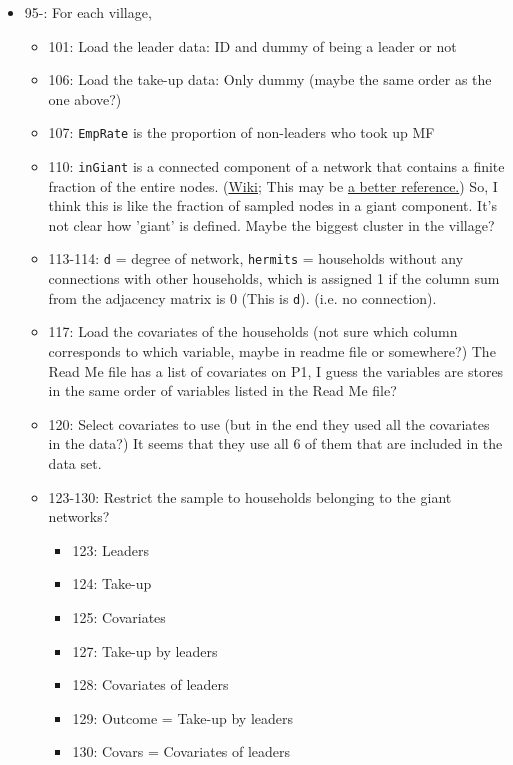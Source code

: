 \documentclass[10pt,letterpaper]{article}
\begin{document}
\begin{itemize}
\begin{itemize}
  \item 95-: For each village,
    \begin{itemize}
      \item 101: Load the leader data: ID and dummy of being a leader or not
      \item 106: Load the take-up data: Only dummy (maybe the same order as the one above?)
      \item 107: \texttt{EmpRate} is the proportion of non-leaders who took up MF
      \item 110: \texttt{inGiant} is a connected component of a network that contains a finite fraction of the entire nodes. (\href{https://en.wikipedia.org/wiki/Giant_component}{Wiki}; This may be \href{https://www.futurelearn.com/courses/social-media/0/steps/16048}{a better reference.}) So, I think this is like the fraction of sampled nodes in a giant component. It's not clear how 'giant' is defined. Maybe the biggest cluster in the village?
      \item 113-114: \texttt{d} = degree of network, \texttt{hermits} = households without any connections with other households, which is assigned 1 if the column sum from the adjacency matrix is 0 (This is \texttt{d}). (i.e. no connection).
      \item 117: Load the covariates of the households (not sure which column corresponds to which variable, maybe in readme file or somewhere?) The Read Me file has a list of covariates on P1, I guess the variables are stores in the same order of variables listed in the Read Me file?
      \item 120: Select covariates to use (but in the end they used all the covariates in the data?) It seems that they use all 6 of them that are included in the data set.
      \item 123-130: Restrict the sample to households belonging to the giant networks?
        \begin{itemize}
          \item 123: Leaders
          \item 124: Take-up
          \item 125: Covariates
          \item 127: Take-up by leaders
          \item 128: Covariates of leaders
          \item 129: Outcome = Take-up by leaders
          \item 130: Covars = Covariates of leaders
            \begin{itemize}

\end{itemize}
\end{itemize}
\end{itemize}
\end{itemize}
\end{itemize}
\end{document}
